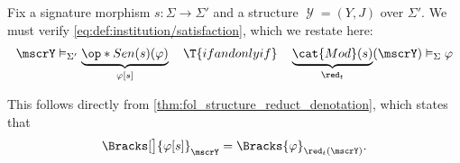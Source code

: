 \begin{defproof}
  Fix a signature morphism \( s: \Sigma \to \Sigma' \) and a structure \( \mscrY = (Y, J) \) over \( \Sigma' \). We must verify \eqref{eq:def:institution/satisfaction}, which we restate here:
  \begin{equation*}
    \mscrY \vDash_{\Sigma'} \underbrace{\op*{Sen}(s)(\varphi)}_{\varphi[s]}
    \quad\T{if and only if}\quad
    \underbrace{\cat{Mod}(s)}_{\red_t}(\mscrY) \vDash_\Sigma \varphi
  \end{equation*}

  This follows directly from \cref{thm:fol_structure_reduct_denotation}, which states that
  \begin{equation*}
    \Bracks[\big]{\varphi[s]}_\mscrY = \Bracks{\varphi}_{\red_t(\mscrY)}.
  \end{equation*}
\end{defproof}

